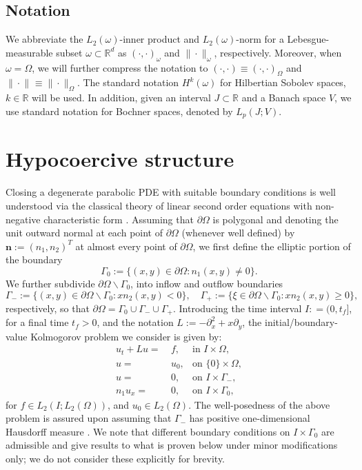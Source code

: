 \documentclass{amsart}
\newcommand{\norm}[2]{\|{#1}\|_{{#2}}}
\newcommand{\gE}{\Gamma_0}
\newcommand{\gif}{\Gamma_-}
\theoremstyle{definition}
\theoremstyle{remark}
\numberwithin{equation}{section}
\begin{document}
\subsection*{Notation}
We abbreviate the $L_2(\omega)$-inner product and $L_2(\omega)$-norm for a Lebesgue-measurable subset $\omega\subset \mathbb{R}^d$ as $(\cdot,\cdot)_{\omega}$ and $\norm{\cdot}{\omega}$, respectively.
Moreover, when $\omega=\Omega$, we will further compress the notation to $(\cdot,\cdot)\equiv (\cdot,\cdot)_{\Omega}$ and $\norm{\cdot}{}\equiv \norm{\cdot}{\Omega}$.
The standard notation $H^k(\omega)$ for Hilbertian Sobolev spaces, $k\in\mathbb{R}$ will be used.
In addition, given an interval $J\subset \mathbb{R}$ and a Banach space $V$, we use standard notation  {for} Bochner spaces, denoted by $L_p(J; V)$.




\section{Hypocoercive structure} \label{sec:weak_form}

Closing a degenerate parabolic PDE with suitable boundary conditions is well understood via the classical theory of linear second order equations with non-negative characteristic form \cite{fichera,or73}.
Assuming that $\partial \Omega$ is polygonal and denoting the unit outward normal at each point of $\partial \Omega$ (whenever well defined) by $\mathbf{n}:=(n_1,n_2)^T$ at almost every point of $\partial\Omega$, we first define the elliptic portion of the boundary
\[
	\gE:=\{(x,y)\in \partial \Omega: n_1(x,y)\ne 0\}.
\]
We further subdivide $\partial \Omega\backslash\gE$, into inflow and outflow boundaries
\[
	\gif:= \{(x,y) \in \partial\Omega\backslash\gE: xn_2(x,y )<0\}, \quad \Gamma_+:= \{\xi \in  \partial\Omega\backslash\gE: xn_2(x,y)   \ge  0\},
\]
respectively, so that
 $\partial \Omega = \gE\cup\gif\cup\Gamma_+$.
Introducing the time interval $I : = (0, t_f]$, for a final time $t_f>0$,  and the notation $ L:= -\partial^2_{x}+x\partial_y$, the initial/boundary-value Kolmogorov problem we consider is given by:
	\begin{equation}\label{eq:kolmogorov-bounded}
	\begin{aligned}
u_t+Lu =&\ f, &\text{in } I\times\Omega,\\
u=&\ u_0, &\text{on } \{0\}\times\Omega,\\
u=&\ 0, &\text{on } I\times\gif,\\
n_1 u_x=&\ 0, &\text{on } I\times \gE,
\end{aligned}
\end{equation}
for $f\in L_2(I; L_2(\Omega))$, and $u_0\in L_2(\Omega)$.
The well-posedness of the above problem is assured upon assuming that $\gif$ has positive one-dimensional Hausdorff measure \cite{or73}. We note  that different boundary conditions  {on} $I\times \gE$ are admissible and give  {results}  to what is proven below under minor modifications only; we do not consider these explicitly for brevity.
\end{document}
